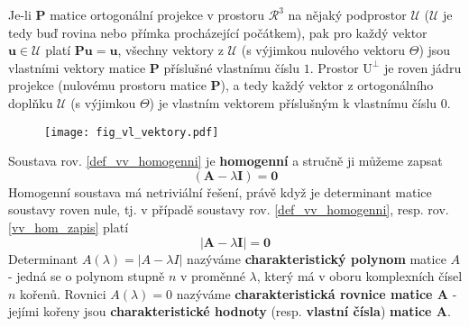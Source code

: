       \begin{example}
        Je-li $\mathbf{P}$ matice ortogonální projekce v prostoru $\mathcal{R}^3$ na nějaký podprostor 
        $\mathcal{U}$ ($\mathcal{U}$ je tedy buď rovina nebo přímka procházející počátkem), pak pro každý 
        vektor $\mathbf{u}\in\mathcal{U}$ platí $\mathbf{Pu} = \mathbf{u}$, všechny vektory z $\mathcal{U}$ 
        (s výjimkou nulového vektoru $\Theta$) jsou vlastními vektory matice $\mathbf{P}$ příslušné vlastnímu 
        číslu $1$. Prostor $\mathrm{U}^\bot$ je roven jádru projekce (nulovému prostoru matice $\mathbf{P}$), 
        a tedy každý vektor z ortogonálního doplňku $\mathcal{U}$ (s výjimkou $\Theta$) je vlastním vektorem 
        příslušným k vlastnímu číslu $0$.
      \end{example} 
      
      \begin{figure}
        \centering
        \texttt{[image: fig\_vl\_vektory.pdf]}
        \caption{ }
        \label{la:fig_vlv}
      \end{figure}
      
      Soustava rov. \ref{def_vv_homogenni} je \textbf{homogenní} a stručně ji můžeme zapsat
      \begin{equation}\label{vv_hom_zapis}
        \left(\mathbf{A} - \lambda\mathbf{I}\right) = \mathbf{0}
      \end{equation}
      Homogenní soustava má netriviální řešení, právě když je determinant matice soustavy roven nule,
      tj. v případě soustavy rov.
      \ref{def_vv_homogenni}, resp. rov. \ref{vv_hom_zapis} platí
      \begin{equation}\label{vv_hom_reseni}
        |\mathbf{A} - \lambda\mathbf{I}| = \mathbf{0}
      \end{equation}
      Determinant $A(\lambda)=|A - \lambda I|$ nazýváme \textbf{charakteristický polynom} matice $A$
      - jedná se o polynom stupně $n$ v proměnné $\lambda$, který má v oboru komplexních čísel $n$
      kořenů. Rovnici $A(\lambda)=0$ nazýváme \textbf{charakteristická rovnice matice A} - jejími
      kořeny jsou \textbf{charakteristické hodnoty} (resp. \textbf{vlastní čísla}) \textbf{matice A}.
      
